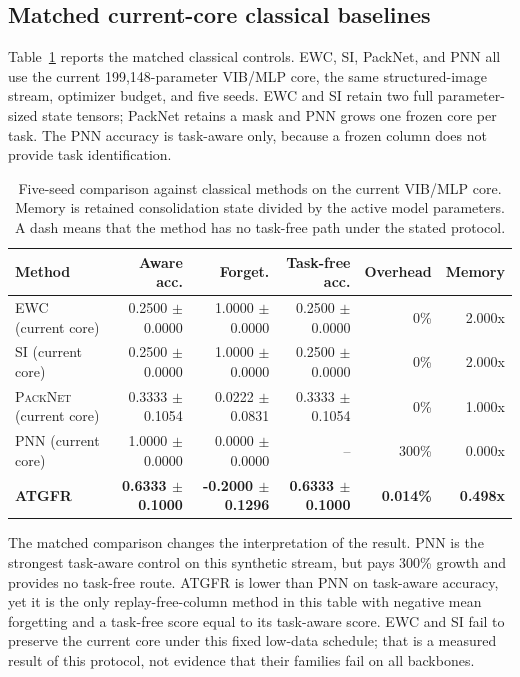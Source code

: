\documentclass[conference]{IEEEtran}
\newcommand{\ATGFR}{\textsc{ATGFR}}
\newcommand{\EWC}{\textsc{EWC}}
\newcommand{\SI}{\textsc{SI}}
\newcommand{\PNN}{\textsc{PNN}}
\newcommand{\PackNet}{\textsc{PackNet}}
\begin{document}
\subsection{Matched current-core classical baselines}

Table~\ref{tab:currentcore} reports the matched classical controls. EWC, SI,
PackNet, and PNN all use the current 199,148-parameter VIB/MLP core,
the same structured-image stream, optimizer budget, and five seeds. EWC and
SI retain two full parameter-sized state tensors; PackNet retains a mask and
PNN grows one frozen core per task. The PNN accuracy is task-aware only,
because a frozen column does not provide task identification.

\begin{table}[t]
\centering
\caption{Five-seed comparison against classical methods on the current
VIB/MLP core. Memory is retained consolidation state divided by the active
model parameters. A dash means that the method has no task-free path under
the stated protocol.}
\label{tab:currentcore}
\small
\begin{tabular}{lrrrrr}
\hline
\textbf{Method} & \textbf{Aware acc.} & \textbf{Forget.} &
\textbf{Task-free acc.} & \textbf{Overhead} & \textbf{Memory}\\
\hline
\EWC{} (current core) & 0.2500 $\pm$ 0.0000 & 1.0000 $\pm$ 0.0000 &
0.2500 $\pm$ 0.0000 & 0\% & 2.000x\\
\SI{} (current core) & 0.2500 $\pm$ 0.0000 & 1.0000 $\pm$ 0.0000 &
0.2500 $\pm$ 0.0000 & 0\% & 2.000x\\
\PackNet{} (current core) & 0.3333 $\pm$ 0.1054 & 0.0222 $\pm$ 0.0831 &
0.3333 $\pm$ 0.1054 & 0\% & 1.000x\\
\PNN{} (current core) & 1.0000 $\pm$ 0.0000 & 0.0000 $\pm$ 0.0000 &
-- & 300\% & 0.000x\\
\textbf{\ATGFR{}} & \textbf{0.6333 $\pm$ 0.1000} &
\textbf{-0.2000 $\pm$ 0.1296} & \textbf{0.6333 $\pm$ 0.1000} &
\textbf{0.014\%} & \textbf{0.498x}\\
\hline
\end{tabular}
\end{table}

The matched comparison changes the interpretation of the result. PNN is the
strongest task-aware control on this synthetic stream, but pays 300\% growth
and provides no task-free route. ATGFR is lower than PNN on task-aware
accuracy, yet it is the only replay-free-column method in this table with
negative mean forgetting and a task-free score equal to its task-aware score.
EWC and SI fail to preserve the current core under this fixed low-data
schedule; that is a measured result of this protocol, not evidence that their
families fail on all backbones.
\end{document}
